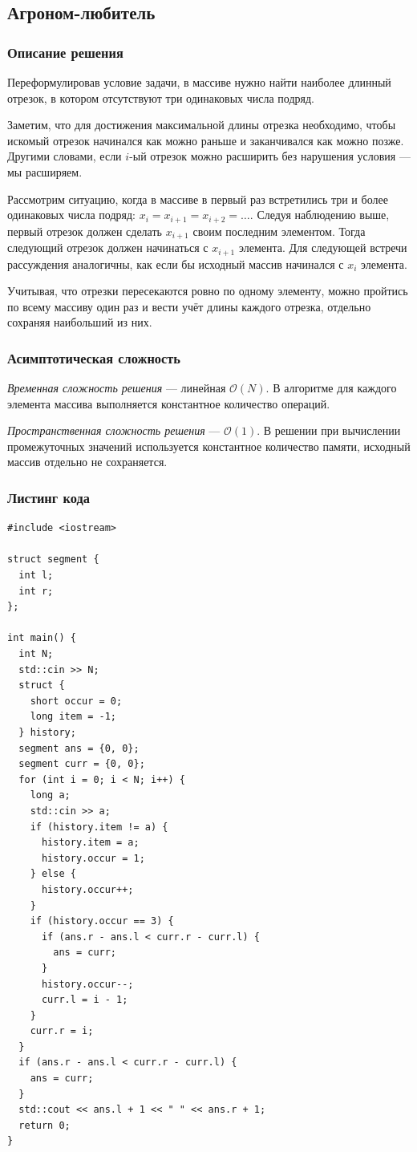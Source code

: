\subsection{Агроном-любитель}

\subsubsection{Описание решения}

Переформулировав условие задачи, в массиве нужно найти наиболее длинный отрезок, в котором отсутствуют три одинаковых числа подряд.

Заметим, что для достижения максимальной длины отрезка необходимо, чтобы искомый отрезок начинался как можно раньше и заканчивался как можно позже. Другими словами, если \( i \)-ый отрезок можно расширить без нарушения условия --- мы расширяем.

Рассмотрим ситуацию, когда в массиве в первый раз встретились три и более одинаковых числа подряд: \( x_i=x_{i+1}=x_{i+2}=\dots \). Следуя наблюдению выше, первый отрезок должен сделать \( x_{i+1} \) своим последним элементом. Тогда следующий отрезок должен начинаться с \( x_{i+1} \) элемента. Для следующей встречи рассуждения аналогичны, как если бы исходный массив начинался с \( x_i \) элемента.

Учитывая, что отрезки пересекаются ровно по одному элементу, можно пройтись по всему массиву один раз и вести учёт длины каждого отрезка, отдельно сохраняя наибольший из них.

\subsubsection{Асимптотическая сложность}

\textit{Временная сложность решения} --- линейная \( \mathcal{O}(N) \). В алгоритме для каждого элемента массива выполняется константное количество операций.

\textit{Пространственная сложность решения} --- \( \mathcal{O}(1) \). В решении при вычислении промежуточных значений используется константное количество памяти, исходный массив отдельно не сохраняется.

\subsubsection{Листинг кода}

\begin{lstlisting}
#include <iostream>

struct segment {
  int l;
  int r;
};

int main() {
  int N;
  std::cin >> N;
  struct {
    short occur = 0;
    long item = -1;
  } history;
  segment ans = {0, 0};
  segment curr = {0, 0};
  for (int i = 0; i < N; i++) {
    long a;
    std::cin >> a;
    if (history.item != a) {
      history.item = a;
      history.occur = 1;
    } else {
      history.occur++;
    }
    if (history.occur == 3) {
      if (ans.r - ans.l < curr.r - curr.l) {
        ans = curr;
      }
      history.occur--;
      curr.l = i - 1;
    }
    curr.r = i;
  }
  if (ans.r - ans.l < curr.r - curr.l) {
    ans = curr;
  }
  std::cout << ans.l + 1 << " " << ans.r + 1;
  return 0;
}
\end{lstlisting}